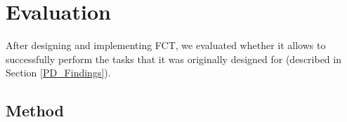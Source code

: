 \section{Evaluation}



After designing and implementing FCT, we evaluated whether it allows to successfully perform the tasks that it was originally designed for (described in Section \ref{PD_Findings}).



\subsection{Method} \label{method}





%
%
%